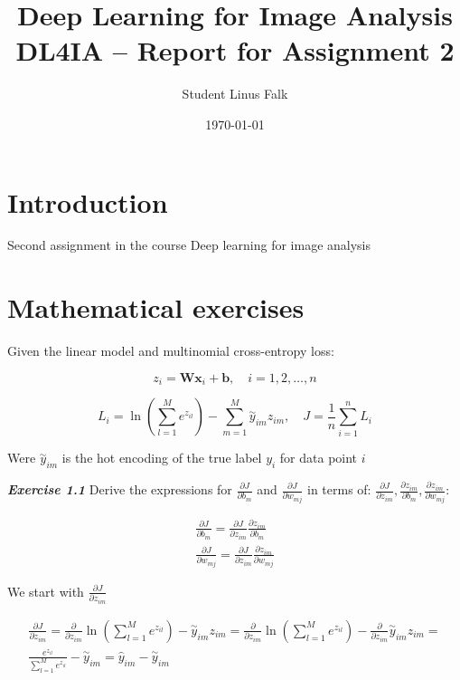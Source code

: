 \documentclass[a4paper,10pt]{article}
\title{\textbf{Deep Learning for Image Analysis} 
\\ DL4IA -- Report for Assignment 2}
\author{Student Linus Falk}
\date{\today}
\begin{document}
\lstset{language=Python}
\maketitle

\section{Introduction}
Second assignment in the course Deep learning for image analysis

\section{Mathematical exercises}
Given the linear model and multinomial cross-entropy loss:

    \begin{equation}
        z_i = \textbf{W}\textbf{x}_{i} + \textbf{b}, \quad i = 1,2,\ldots,n
    \end{equation}

    \begin{equation}
        L_i = \ln \left( \sum_{l=1}^{M} e^{z_{il}}\right) - \sum_{m=1}^{M}\overset{\sim}{y}_{im}z_{im}, \quad J = \frac{1} {n} \sum_{i=1}^{n} L_i  
    \end{equation}

Were $\overset{\sim}{y}_{im}$ is the hot encoding of the true label $y_i$ for data point $i$

\textit{\textbf{Exercise 1.1}}
Derive the expressions for $\frac{\partial J} {\partial b_m} $ and $  \frac{\partial J} {\partial w_{mj}} $ in terms of: $ \frac{\partial J} {\partial z_{im}}, \frac{\partial z_{im}} {\partial b_m}, \frac{\partial z_{im}} {\partial w_{mj}} $:

    \begin{equation}
    \begin{aligned}
        \frac{\partial J} {\partial b_{m}} = \frac{\partial J} {\partial z_{im}}  \frac{\partial z_{im}} {\partial b_{m}}  \\
        \frac{\partial J} {\partial w_{mj}} = \frac{\partial J} {\partial z_{im}}  \frac{\partial z_{im}} {\partial w_{mj}}
    \end{aligned}
    \end{equation}

We start with $\frac{\partial J} {\partial z_{im}} $

    \begin{equation}
    \begin{aligned}
        \frac{\partial J} {\partial z_{im}} = \frac{\partial } {\partial z_{im}} \ln \left( \sum_{l=1}^{M} e^{z_{il}}\right) - \overset{\sim}{y}_{im}z_{im}  = \frac{\partial } {\partial z_{im}} \ln \left( \sum_{l=1}^{M} e^{z_{il}}\right) - \frac{\partial } {\partial z_{im}} \overset{\sim}{y}_{im}z_{im} = \\
        \frac{e^{z_{il}}} {\sum_{l=1}^{M} e^{z_{il}}} - \overset{\sim}{y}_{im} = \hat{y}_{im} - \overset{\sim}{y}_{im}
    \end{aligned}
    \end{equation}
\end{document}
